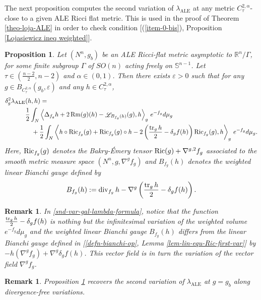 \documentclass[a4paper,11pt,reqno]{amsart}
\newtheorem{prop}[defn]{Proposition}
\newtheorem{rk}[defn]{Remark}
\def\RR{\mathbb{R}}
\def\Ric{\mathop{\rm Ric}\nolimits}
\def\Rm{\mathop{\rm Rm}\nolimits}
\def\tr{\mathop{\rm tr}\nolimits}
\def\div{\mathop{\rm div}\nolimits}
\def\Li{\mathop{\rm \mathscr{L}}\nolimits}
\def\Ric{\mathop{\rm Ric}\nolimits}
\def\Rm{\mathop{\rm Rm}\nolimits}
\def\tr{\mathop{\rm tr}\nolimits}
\def\div{\mathop{\rm div}\nolimits}
\def\Li{\mathop{\rm \mathscr{L}}\nolimits}
\numberwithin{equation}{section}
\begin{document}
	The next proposition computes the second variation of $\lambda_{\operatorname{ALE}}$ at any metric $C^{2,\alpha}_{\tau}$-close to a given ALE Ricci flat metric. This is used in the proof of Theorem \ref{theo-loja-ALE} in order to check condition [(\ref{item-0-bis}), Proposition \ref{Lojasiewicz ineq weighted}].   
	\begin{prop}\label{snd-var-gal-lambda}
		Let $(N^n,g_b)$ be an ALE Ricci-flat metric asymptotic to $\RR^n\slash\Gamma$, for some finite subgroup $\Gamma$ of $SO(n)$ acting freely on $\mathbb{S}^{n-1}$. Let $\tau\in(\frac{n-2}{2},n-2)$ and $\alpha\in(0,1)$. Then there exists $\varepsilon>0$ such that for any $g\in B_{C^{2,\alpha}_{\tau}}(g_b,\varepsilon)$ and any $h\in C^{2,\alpha}_{\tau}$,
		\begin{equation}
		\begin{split}\label{snd-var-gal-lambda-formula}
\delta^2_g\lambda_{\operatorname{ALE}}&(h,h)=\\
&\frac{1}{2}\int_N\left\langle\Delta_{f_g}h+2\Rm(g)(h)-\Li_{B_{f_g}(h)}(g),h\right\rangle_g\,e^{-f_g}d\mu_g\\
&\quad+\frac{1}{2}\int_N\left\langle h\circ\Ric_{f_g}(g)+\Ric_{f_g}(g)\circ h-2\left(\frac{\tr_gh}{2}-\delta_gf(h)\right)\Ric_{f_g}(g),h\right\rangle_g\,e^{-f_g}d\mu_g.
		\end{split}
		\end{equation}
		Here, $\Ric_{f_g}(g)$ denotes the Bakry-\'Emery tensor $\Ric(g)+\nabla^{g,2}f_g$ associated to the smooth metric measure space $(N^n,g,\nabla^gf_g)$ and $B_{f_g}(h)$ denotes the weighted linear Bianchi gauge defined by 
		$$B_{f_g}(h):=\div_{f_g}h-\nabla^g\left(\frac{\tr_gh}{2}-\delta_gf(h)\right).$$
		\end{prop}
	\begin{rk}
	In \eqref{snd-var-gal-lambda-formula}, notice that the function $\frac{\tr_gh}{2}-\delta_gf(h)$ is nothing but the infinitesimal variation of the weighted volume $e^{-f_g}d\mu_g$ and the weighted linear Bianchi gauge $B_{f_g}(h)$ differs from the linear Bianchi gauge defined in [\ref{defn-bianchi-op}, Lemma \ref{lem-lin-equ-Ric-first-var}] by $-h(\nabla^gf_g)+\nabla^g\delta_gf(h)$. This vector field is in turn the variation of the vector field $\nabla^g f_g$.
		\end{rk}
		\begin{rk}
		Proposition \ref{snd-var-gal-lambda} recovers the second variation of $\lambda_{\operatorname{ALE}}$ at $g=g_b$ along divergence-free variations.
		\end{rk}
\end{document}
